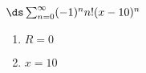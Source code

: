 {$\ds\sum_{n=0}^\infty (-1)^nn!(x-10)^{n}$
}
{\begin{enumerate}
	\item $R=0$
	\item	$x=10$
\end{enumerate}
}